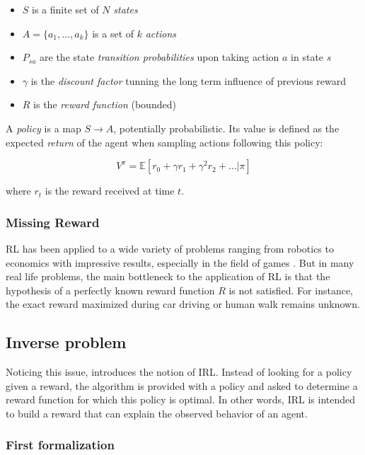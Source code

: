 \documentclass{article}
\begin{document}
\begin{itemize}
    \item $S$ is a finite set of $N$ \emph{states}
    \item $A=\{a_1,...,a_k\}$ is a set of $k$ \emph{actions}
    \item $P_{sa}$ are the state \emph{transition probabilities} upon taking action $a$ in state $s$
    \item $\gamma$ is the \emph{discount factor} tunning the long term influence of previous reward
    \item $R$ is the \emph{reward function} (bounded)
\end{itemize}

A \emph{policy} is a map $S \rightarrow A$, potentially probabilistic. Its value is defined as the expected \emph{return} of the agent when sampling actions following this policy:

\[
V^{\pi} = \mathbb E[r_0 + \gamma r_1 + \gamma^2 r_2 + \dots|\pi]
\]

where $r_t$ is the reward received at time $t$.

\subsubsection{Missing Reward}

RL has been applied to a wide variety of problems ranging from robotics \cite{Kober13} to economics \cite{Tesauro02} with impressive results, especially in the field of games \cite{Silver16}. But in many real life problems, the main bottleneck to the application of RL is that the hypothesis of a perfectly known reward function $R$ is not satisfied. For instance, the exact reward maximized during car driving \cite{Shalev16} or human walk \cite{Morimoto04} remains unknown.

\subsection{Inverse problem}

Noticing this issue, \cite{Russell98} introduces the notion of IRL. Instead of looking for a policy given a reward, the algorithm is provided with a policy and asked to determine a reward function for which this policy is optimal. In other words, IRL is intended to build a reward that can explain the observed behavior of an agent.

\subsubsection{First formalization}
\end{document}

